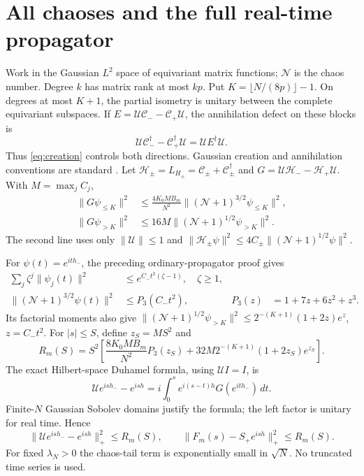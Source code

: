 \documentclass[11pt,a4paper]{article}
\newcommand{\NN}{\mathcal N}
\begin{document}
\newpage
\section{All chaoses and the full real-time propagator}
Work in the Gaussian $L^2$ space of equivariant matrix functions;
$\NN$ is the chaos number. Degree $k$ has matrix rank at most $kp$.
Put $K=\lfloor N/(8p)\rfloor-1$. On degrees at most $K+1$, the
partial isometry is unitary between the complete equivariant
subspaces. If $E=\mathcal U\mathcal C_- -\mathcal C_+\mathcal U$,
the annihilation defect on these blocks is
\begin{equation}
 \mathcal U\mathcal C_-^\dagger-\mathcal C_+^\dagger\mathcal U
 =\mathcal U E^\dagger\mathcal U.
\end{equation}
Thus \eqref{eq:creation} controls both directions. Gaussian
creation and annihilation conventions are standard \cite{ChenLiu}.
Let $\mathcal H_\pm=L_{H_\pm}=\mathcal C_\pm+\mathcal C_\pm^\dagger$
and $G=\mathcal U\mathcal H_- -\mathcal H_+\mathcal U$.
With $M=\max_j C_j$,
\begin{align}
 \|G\psi_{\le K}\|^2
 &\le\frac{4K_0 M B_m}{N^2}\|(\NN+1)^{3/2}\psi_{\le K}\|^2,\\
 \|G\psi_{>K}\|^2
 &\le16M\|(\NN+1)^{1/2}\psi_{>K}\|^2.
\end{align}
The second line uses only $\|\mathcal U\|\le1$ and
$\|\mathcal H_\pm\psi\|^2\le4C_\pm\|(\NN+1)^{1/2}\psi\|^2$.

For $\psi(t)=e^{ith_-}$, the preceding ordinary-propagator proof gives
\begin{align}
 \sum_j\zeta^j\|\psi_j(t)\|^2&\le e^{C_-t^2(\zeta-1)},\quad\zeta\ge1,\\
 \|(\NN+1)^{3/2}\psi(t)\|^2&\le P_3(C_-t^2),
 &P_3(z)&=1+7z+6z^2+z^3.
\end{align}
Its factorial moments also give
$\|(\NN+1)^{1/2}\psi_{>K}\|^2
\le2^{-(K+1)}(1+2z)e^z$, $z=C_-t^2$.
For $|s|\le S$, define $z_S=MS^2$ and
\begin{equation}
 R_m(S)=S^2\left[
 \frac{8K_0 M B_m}{N^2}P_3(z_S)
 +32M2^{-(K+1)}(1+2z_S)e^{z_S}\right].
\end{equation}
The exact Hilbert-space Duhamel formula, using $\mathcal U I=I$, is
\begin{equation}
 \mathcal Ue^{ish_-}-e^{ish}
 =i\int_0^s e^{i(s-t)h}G(e^{ith_-})\,dt.
\end{equation}
Finite-$N$ Gaussian Sobolev domains justify the formula; the left
factor is unitary for real time. Hence
\begin{equation}
 \|\mathcal Ue^{ish_-}-e^{ish}\|_+^2\le R_m(S),\qquad
 \|F_m(s)-S_+e^{ish}\|_+^2\le R_m(S).
 \label{eq:rankproxy}
\end{equation}
For fixed $\lambda_N>0$ the chaos-tail term is exponentially small
in $\sqrt N$. No truncated time series is used.
\end{document}
